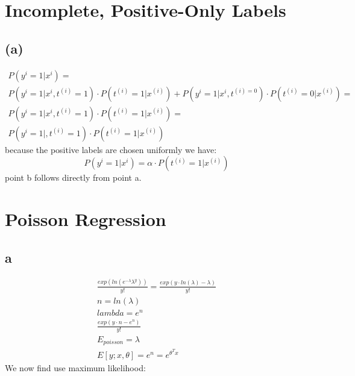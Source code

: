 \documentclass[11pt]{article}
\begin{document}
\section{ Incomplete, Positive-Only Labels}
\subsection{(a)}
\begin{gather*}
    P(y^{i}=1|x^{i}) = 
    \\
    P(y^{i}=1|x^{i},t^{(i)}=1)\cdot P(t^{(i)}=1|x^{(i)})+
    P(y^{i}=1|x^{i},t^{(i)=0})\cdot P(t^{(i)}=0|x^{(i)}) = 
    \\
    P(y^{i}=1|x^{i},t^{(i)}=1)\cdot P(t^{(i)}=1|x^{(i)})=\\
    P(y^{i}=1|,t^{(i)}=1)\cdot P(t^{(i)}=1|x^{(i)})
\end{gather*}
because the positive labels are chosen uniformly we have:
\begin{equation}
    P(y^{i}=1|x^{i}) = \alpha \cdot P(t^{(i)}=1|x^{(i)})
\end{equation}
point b follows directly from point a.
\section{Poisson Regression}
\subsection{a}
\begin{gather}
    \frac{exp(ln(e^{-\lambda}\lambda^y))}{y!}=
    \frac{exp(y\cdot ln(\lambda)-\lambda)}{y!}\\
    n = ln(\lambda)\\
    lambda = e^{n}\\
    \frac{exp(y\cdot n - e^{n})}{y!}\\
    E_{poisson} = \lambda\\
    E[y;x,\theta] = e^n = e^{\theta^Tx}
\end{gather}
We now find use maximum likelihood:
\end{document}

